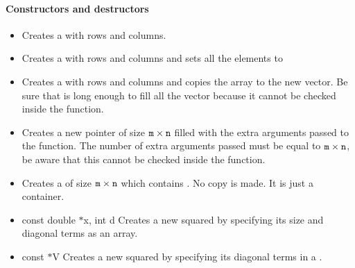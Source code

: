 \paragraph{Constructors and destructors}
\begin{itemize}
\item {}
  \sshortdescribe Creates a   with  rows and  columns.

\item {}
  \sshortdescribe Creates a  with  rows and 
  columns and sets all the elements to 

\item {}
  \sshortdescribe Creates a  with  rows and 
  columns and copies the array  to the new vector. Be sure that 
  is long enough to fill all the vector because it cannot be checked inside the function.

\item {}
  \sshortdescribe Creates a new  pointer of size ${\tt m
    \times n}$ filled with the extra arguments passed to the function. The
  number of extra arguments passed must be equal to ${\tt m \times n}$, be
  aware that this cannot be checked inside the function.

\item {}
  \sshortdescribe Creates a  of size ${\tt m} \times
  {\tt n}$ which contains . No copy is made. It is just a container.
  
\item {}
  {const double $\ast$x, int d}
  \sshortdescribe Creates a new squared  by specifying its size and
  diagonal terms as an array.

\item {}
  {const  $\ast$V}
  \sshortdescribe Creates a new squared  by specifying its diagonal
  terms in a .


\end{itemize}
